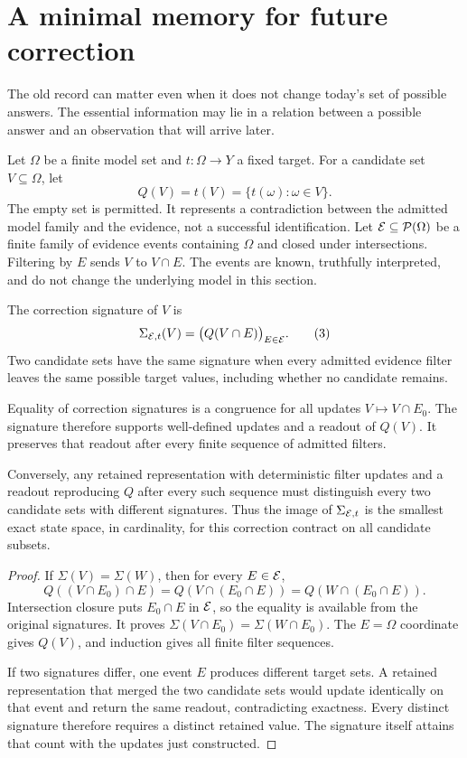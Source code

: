 \section{A minimal memory for future correction}\label{GA:sec:memory}
The old record can matter even when it does not change today's set of possible answers. The essential information may lie in a relation between a possible answer and an observation that will arrive later.

Let $\Omega$ be a finite model set and $t:\Omega\to Y$ a fixed target. For a candidate set $V\subseteq\Omega$, let
\[
Q(V)=t(V)=\{t(\omega):\omega\in V\}.
\]
The empty set is permitted. It represents a contradiction between the admitted model family and the evidence, not a successful identification. Let $\mathcal E\subseteq\mathcal P(\Omega)$ be a finite family of evidence events containing $\Omega$ and closed under intersections. Filtering by $E$ sends $V$ to $V\cap E$. The events are known, truthfully interpreted, and do not change the underlying model in this section.

\begin{GAdefinition}\label{GA:def:signature}
The correction signature of $V$ is
\[
\Sigma_{\mathcal E,t}(V)=\bigl(Q(V\cap E)\bigr)_{E\in\mathcal E}.\tag{3}
\]
Two candidate sets have the same signature when every admitted evidence filter leaves the same possible target values, including whether no candidate remains.
\end{GAdefinition}

\begin{GAtheorem}\label{GA:thm:correction}
Equality of correction signatures is a congruence for all updates $V\mapsto V\cap E_0$. The signature therefore supports well-defined updates and a readout of $Q(V)$. It preserves that readout after every finite sequence of admitted filters.

Conversely, any retained representation with deterministic filter updates and a readout reproducing $Q$ after every such sequence must distinguish every two candidate sets with different signatures. Thus the image of $\Sigma_{\mathcal E,t}$ is the smallest exact state space, in cardinality, for this correction contract on all candidate subsets.
\end{GAtheorem}
\begin{proof}
If $\Sigma(V)=\Sigma(W)$, then for every $E\in\mathcal E$,
\[
Q((V\cap E_0)\cap E)=Q(V\cap(E_0\cap E))
=Q(W\cap(E_0\cap E)).
\]
Intersection closure puts $E_0\cap E$ in $\mathcal E$, so the equality is available from the original signatures. It proves $\Sigma(V\cap E_0)=\Sigma(W\cap E_0)$. The $E=\Omega$ coordinate gives $Q(V)$, and induction gives all finite filter sequences.

If two signatures differ, one event $E$ produces different target sets. A retained representation that merged the two candidate sets would update identically on that event and return the same readout, contradicting exactness. Every distinct signature therefore requires a distinct retained value. The signature itself attains that count with the updates just constructed.
\end{proof}

